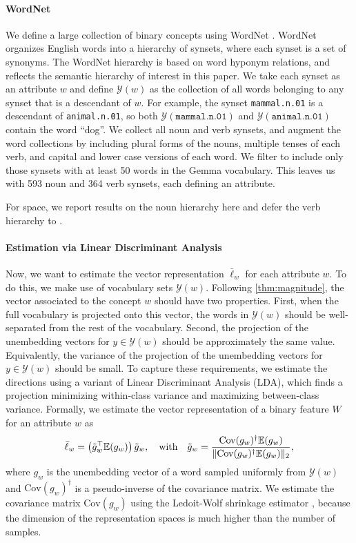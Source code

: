 \documentclass{article}
\newcommand{\cov}{\mathrm{Cov}}
\newcommand{\yquad}{\mathcal{Y}}
\begin{document}
\paragraph*{WordNet}
We define a large collection of binary concepts using WordNet .
WordNet organizes English words into a hierarchy of synsets, where each synset is a set of synonyms. The WordNet hierarchy is based on word hyponym relations, and reflects the semantic hierarchy of interest in this paper. We take each synset as an attribute $w$ and define $\yquad(w)$ as the collection of all words belonging to any synset that is a descendant of $w$. For example, the synset \texttt{mammal.n.01} is a descendant of \texttt{animal.n.01}, so both $\mathcal{Y}(\texttt{mammal.n.01})$ and $\mathcal{Y}(\texttt{animal.n.01})$ contain the word ``dog''. We collect all noun and verb synsets, and augment the word collections by including plural forms of the nouns, multiple tenses of each verb, and capital and lower case versions of each word. We filter to include only those synsets with at least 50 words in the Gemma vocabulary. This leaves us with 593 noun and 364 verb synsets, each defining an attribute.

For space, we report results on the noun hierarchy here and defer the verb hierarchy to .

\paragraph{Estimation via Linear Discriminant Analysis}
Now, we want to estimate the vector representation $\bar\ell_w$ for each attribute $w$.
To do this, we make use of vocabulary sets $\yquad(w)$.
Following \cref{thm:magnitude}, the vector associated to the concept $w$ should have two properties. First, when the full vocabulary is projected onto this vector, the words in $\yquad(w)$ should be well-separated from the rest of the vocabulary. Second, the projection of the unembedding vectors for $y\in \yquad(w)$ should be approximately the same value. Equivalently, the variance of the projection of the unembedding vectors for $y\in \yquad(w)$ should be small.
To capture these requirements, we estimate the directions using a variant of Linear Discriminant Analysis (LDA),
which finds a projection minimizing within-class variance and maximizing between-class variance.
Formally, we estimate the vector representation of a binary feature $W$ for an attribute $w$ as
\begin{equation}\label{eq:estimated_vector}
  \bar\ell_w =   \left(\tilde{g}_w^\top\EE(g_w)\right)\tilde{g}_w, \quad \text{with}\quad \tilde{g}_w= \frac{\cov(g_w)^{\dagger} \EE(g_w)}{\|\cov(g_w)^{\dagger} \EE(g_w)\|_2},
\end{equation}
where $g_w$ is the unembedding vector of a word sampled uniformly from $\yquad(w)$ and $\cov(g_w)^{\dagger}$ is a pseudo-inverse of the covariance matrix. We estimate the covariance matrix $\cov(g_w)$ using the Ledoit-Wolf shrinkage estimator , because the dimension of the representation spaces is much higher than the number of samples.
\end{document}
